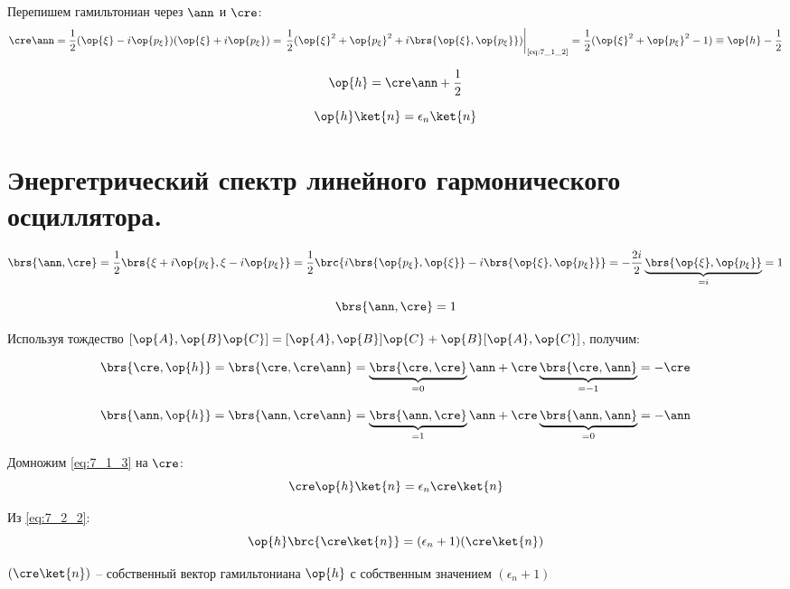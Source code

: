 Перепишем гамильтониан через $\ann$ и $\cre$:
$$
\cre\ann = \frac{1}{2} (\op{\xi} - i\op{p_\xi})(\op{\xi} + i\op{p_\xi}) = \left. \frac{1}{2}(\op{\xi}^2 + \op{p_\xi}^2 + i \brs{\op{\xi}, \op{p_\xi}}) \right|_{\text{\eqref{eq:7_1_2}}} = \frac{1}{2} (\op{\xi}^2 + \op{p_\xi}^2 - 1) \equiv \op{h} - \frac{1}{2}
$$

$$
\op{h} = \cre\ann + \frac{1}{2}
$$

\begin{equation}
\label{eq:7_1_3}
\op{h} \ket{n} = \epsilon_n \ket{n}
\end{equation}

\section{Энергетрический спектр линейного гармонического осциллятора.}

$$
\brs{\ann, \cre} = \frac{1}{2} \brs{ \xi + i\op{p_\xi},  \xi - i\op{p_\xi}} = \frac{1}{2} \brc{ i\brs{\op{p_\xi}, \op{\xi}} - i \brs{\op{\xi}, \op{p_\xi}} } = -\frac{2i}{2} \underbrace{ \brs{\op{\xi}, \op{p_\xi}}}_{= i} = 1
$$

\begin{equation}
\label{eq:7_2_1}
\brs{\ann, \cre} = 1
\end{equation}

Используя тождество $[\op{A}, \op{B}\op{C}] = [\op{A}, \op{B}] \op{C} + \op{B} [\op{A}, \op{C}]$, получим:

\begin{equation}
\label{eq:7_2_2}
\brs{\cre, \op{h}} = \brs{\cre, \cre\ann} = \underbrace{\brs{\cre, \cre}}_{= 0} \ann + \cre \underbrace{\brs{\cre, \ann}}_{= -1} = - \cre
\end{equation}

\begin{equation}
\label{eq:7_2_3}
\brs{\ann, \op{h}} = \brs{\ann, \cre\ann} = \underbrace{\brs{\ann, \cre}}_{= 1} \ann + \cre \underbrace{\brs{\ann, \ann}}_{= 0} = - \ann
\end{equation}

Домножим \eqref{eq:7_1_3} на $\cre$:
$$
\cre \op{h} \ket{n} = \epsilon_n \cre \ket{n}
$$

Из \eqref{eq:7_2_2}:
\begin{equation}
\label{eq:7_2_4}
\op{h} \brc{\cre \ket{n}} = (\epsilon_n + 1)(\cre \ket{n})
\end{equation}

$(\cre \ket{n})$ -- собственный вектор гамильтониана $\op{h}$ с собственным значением $(\epsilon_n + 1)$

